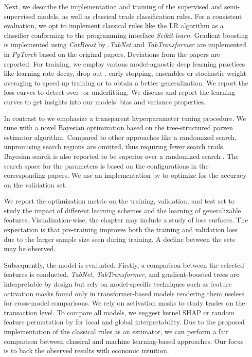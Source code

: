 Next, we describe the implementation and training of the supervised and semi-supervised models, as well as classical trade classification rules. 
For a consistent evaluation, we opt to implement classical rules like the LR algorithm as a classifier conforming to the programming interface \textit{Scikit-learn}\autocite{pedregosaScikitlearnMachineLearning2018}.
Gradient boosting is implemented using \textit{CatBoost} by \textcite{prokhorenkovaCatBoostUnbiasedBoosting2018}.\textit{TabNet} and \textit{TabTransformer} are implemented in \textit{PyTorch} based on the original papers. Deviations from the papers are reported.
For training, we employ various model-agnostic deep learning practices like learning rate decay, drop out \autocite{hintonImprovingNeuralNetworks2012}, early stopping, ensembles \autocite{huangSnapshotEnsemblesTrain2017} or stochastic weight averaging \autocite{izmailovAveragingWeightsLeads2019} to speed up training or to obtain a better generalization. We report the loss curves to detect over- or underfitting. We discuss and report the learning curves to get insights into our models' bias and variance properties.  

In contrast to \textcite{ronenMachineLearningTrade2022} we emphasize a transparent hyperparameter tuning procedure. We tune with a novel Bayesian optimization based on the tree-structured parzen estimator algorithm. Compared to other approaches like a randomized search, unpromising search regions are omitted, thus requiring fewer search trails. Bayesian search is also reported to be superior over a randomized search \autocite{turnerBayesianOptimizationSuperior2021}. The search space for the parameters is based on the configurations in the corresponding papers. We use an implementation by \textcite{akibaOptunaNextgenerationHyperparameter2019} to optimize for the accuracy on the validation set. 

We report the optimization metric on the training, validation, and test set to study the impact of different learning schemes and the learning of generalizable features. Visualization-wise, the chapter may include a study of loss surfaces. The expectation is that pre-training improves both the training and validation loss due to the larger sample size seen during training. A decline between the sets may be observed.

Subsequently, the model is evaluated. Firstly, a comparison between the selected features is conducted. \textit{TabNet}, \textit{TabTransformer}, and gradient-boosted trees are interpretable by design but rely on model-specific techniques such as feature activation masks found only in transformer-based models rendering them useless for cross-model comparisons. We rely on activation masks to study trades on the transaction level. To compare all models, we suggest kernel \gls{SHAP} \autocite{lundbergUnifiedApproachInterpreting2017} or random feature permutation by \textcite{breimanRandomForests2001} for local and global interpretability. Due to the proposed implementation of the classical rules as an estimator, we can perform a fair comparison between classical and machine learning-based approaches. Our focus is to back the observed results with economic intuition.

